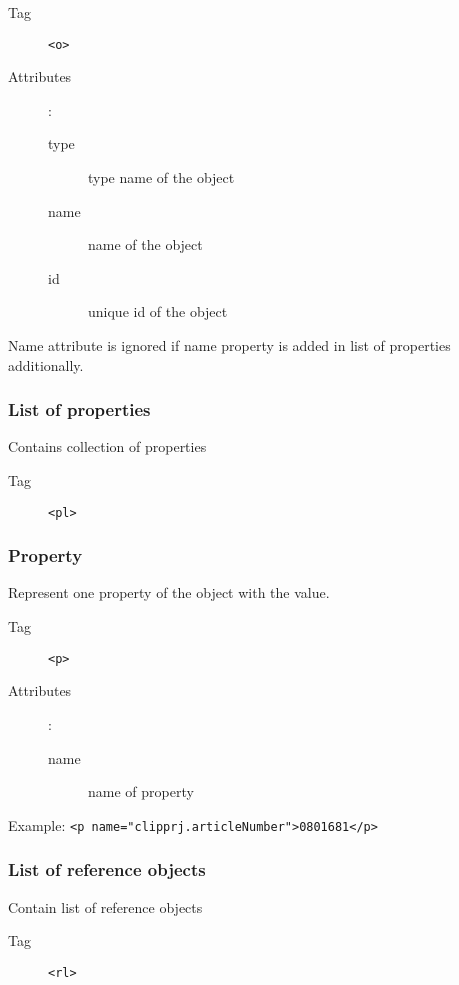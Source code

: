\documentclass[%
	a4paper,
	oneside,
	listof=numbered,
	parskip=half,
	headsepline=true,
	footsepline=false,
	normalheadings,
	0.7headlines,
	headexclude,
	]{scrbook}
\begin{document}
\begin{description}
	\item[Tag] \verb|<o>|
	\item[Attributes]:
	
	\begin{description}
		\item[type] type name of the object
		\item[name] name of the object
		\item[id] unique id of the object
	\end{description}
\end{description}

Name attribute is ignored if name property is added in list of properties additionally.

\subsubsection{List of properties}

Contains collection of properties

\begin{description}
	\item[Tag] \verb|<pl>|
\end{description}

\subsubsection{Property}

Represent one property of the object with the value.

\begin{description}
	\item[Tag] \verb|<p>|
	\item[Attributes]:
	
	\begin{description}
		\item[name] name of property
	\end{description}
\end{description}

Example: \verb|<p name="clipprj.articleNumber">0801681</p>|

\subsubsection{List of reference objects}

Contain list of reference objects

\begin{description}
	\item[Tag] \verb|<rl>|
\end{description}
\end{document}
